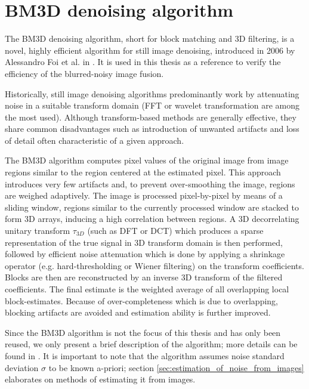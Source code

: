 \documentclass[12pt,notitlepage]{report}
\begin{document}
\section{BM3D denoising algorithm}
\label{sec:bm3d_denoising_algorithm}

The BM3D denoising algorithm, short for block matching and 3D filtering, is a novel, highly efficient algorithm for still image denoising, introduced in 2006 by Alessandro Foi et al. in \cite{bm3d}. It is used in this thesis as a reference to verify the efficiency of the blurred-noisy image fusion.

Historically, still image denoising algorithms predominantly work by attenuating noise in a suitable transform domain (FFT or wavelet transformation are among the most used). Although transform-based methods are generally effective, they share common disadvantages such as introduction of unwanted artifacts and loss of detail often characteristic of a given approach. 

The BM3D algorithm computes pixel values of the original image from image regions similar to the region centered at the estimated pixel. This approach introduces very few artifacts and, to prevent over-smoothing the image, regions are weighed adaptively. The image is processed pixel-by-pixel by means of a sliding window, regions similar to the currently processed window are stacked to form 3D arrays, inducing a high correlation between regions. A 3D decorrelating unitary transform $\tau_{3D}$ (such as DFT or DCT) which produces a sparse representation of the true signal in 3D transform domain is then performed, followed by efficient noise attenuation which is done by applying a shrinkage operator (e.g. hard-thresholding or Wiener filtering) on the transform coefficients. Blocks are then are reconstructed by an inverse 3D transform of the filtered coefficients. The final estimate is the weighted average of all overlapping local block-estimates. Because of over-completeness which is due to overlapping, blocking artifacts are avoided and estimation ability is further improved. 

Since the BM3D algorithm is not the focus of this thesis and has only been reused, we only present a brief description of the algorithm; more details can be found in \cite{bm3d}. It is important to note that the algorithm assumes noise standard deviation $\sigma$ to be known a-priori; section \ref{sec:estimation_of_noise_from_images} elaborates on methods of estimating it from images. 
\end{document}
